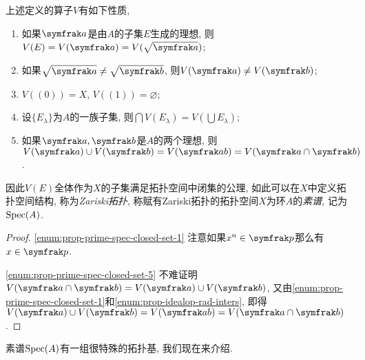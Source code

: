 \begin{proposition}\label{prop:primespecclosedset}
  上述定义的算子$V$有如下性质,
  \begin{enumerate}
    \item\label{enum:prop-prime-spec-closed-set-1} 如果$\ideal{a}$是由$A$的子集$E$生成的理想, 则$V(E)=V(\ideal{a})=V(\sqrt{\ideal{a}})$;
    \item\label{enum:prop-prime-spec-closed-set-2} 如果$\sqrt{\ideal{a}}\neq\sqrt{\ideal{b}}$, 则$V(\ideal{a})\neq V(\ideal{b})$;
    \item\label{enum:prop-prime-spec-closed-set-3} $V((0))=X$, $V((1))=\varnothing$;
    \item\label{enum:prop-prime-spec-closed-set-4} 设$\{E_\lambda\}$为$A$的一族子集, 则$\bigcap V(E_\lambda)=V(\bigcup E_\lambda)$;
    \item\label{enum:prop-prime-spec-closed-set-5} 如果$\ideal{a}, \ideal{b}$是$A$的两个理想, 则$V(\ideal{a})\cup V(\ideal{b})=V(\ideal{ab})= V(\ideal{a}\cap \ideal{b})$.
  \end{enumerate}
  因此$V(E)$全体作为$X$的子集满足拓扑空间中闭集的公理, 如此可以在$X$中定义拓扑空间结构, 称为\emph{Zariski拓扑}, 称赋有Zariski拓扑的拓扑空间$X$为环$A$的\emph{素谱}, 记为$\operatorname{Spec} (A)$.
\end{proposition}

\begin{proof}
  \ref{enum:prop-prime-spec-closed-set-1} 注意如果$x^n\in \ideal{p}$那么有$x\in\ideal{p}$.

  \ref{enum:prop-prime-spec-closed-set-5} 不难证明$V(\ideal{a}\cap\ideal{b})=V(\ideal{a})\cup V(\ideal{b})$, 又由\ref{enum:prop-prime-spec-closed-set-1}和\ref{enum:prop-idealop-rad-inters}, 即得$V(\ideal{a})\cup V(\ideal{b})=V(\ideal{ab})= V(\ideal{a}\cap \ideal{b})$.
\end{proof}

素谱$\operatorname{Spec} (A)$有一组很特殊的拓扑基, 我们现在来介绍.

